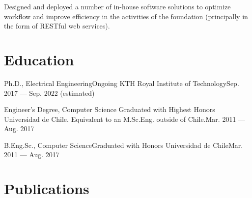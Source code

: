 \documentclass[letterpaper,10pt]{article}
\begin{document}
Designed and deployed a number of in-house software solutions to optimize workflow and improve efficiency in the activities of the foundation (principally in the form of RESTful web services).





\resumeSubHeadingListEnd


\section{Education} 
\resumeSubHeadingListStart
\resumeSubheading
{Ph.D., Electrical Engineering}{Ongoing}
{KTH Royal Institute of Technology}{Sep. 2017 --- Sep. 2022 (estimated)}

\resumeSubheading
{Engineer's Degree, Computer Science} {Graduated with Highest Honors}
{Universidad de Chile. Equivalent to an M.Sc.Eng. outside of Chile.}{Mar. 2011 --- Aug. 2017}

\resumeSubheading
{B.Eng.Sc., Computer Science}{Graduated with Honors}
{Universidad de Chile}{Mar. 2011 --- Aug. 2017}
\resumeSubHeadingListEnd

\section{Publications}
\begin{multicols}{2}
\nocite{*}
\printbibliography[heading=none]%
\end{multicols}
\end{document}
